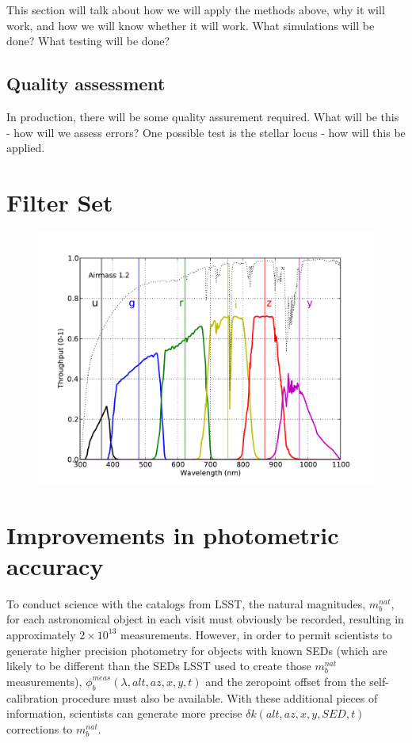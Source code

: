 \documentclass[12pt,preprint]{aastex}
\begin{document}
This section will talk about how we will apply the methods above, why
it will work, and how we will know whether it will work. What
simulations will be done? What testing
will be done? 


\subsection{Quality assessment}
In production, there will be some quality assurement required. What
will be this - how will we assess errors? 
One possible test is the stellar locus - how will this be applied.







\appendix


\section{Filter Set}

\begin{figure}[ht]
\includegraphics[width=5in]{filters}
\end{figure}


\section{Improvements in photometric accuracy}
\label{sec:photo_better}

To conduct science with the catalogs from LSST, the natural magnitudes, $m_b^{nat}$, for each astronomical object in
each visit must obviously be recorded, resulting in approximately
$2\times10^{13}$ measurements. However, in order to permit scientists
to generate higher precision photometry for objects with known SEDs
(which are likely to be different than the SEDs LSST used to create
those $m_b^{nat}$ measurements),
$\phi_b^{meas}(\lambda,alt,az,x,y,t)$ and the zeropoint offset from
the self-calibration procedure must also be available. With these
additional pieces of information, scientists can generate more precise
$\delta k(alt,az,x,y,SED,t)$ corrections to $m_b^{nat}$.
\end{document}
